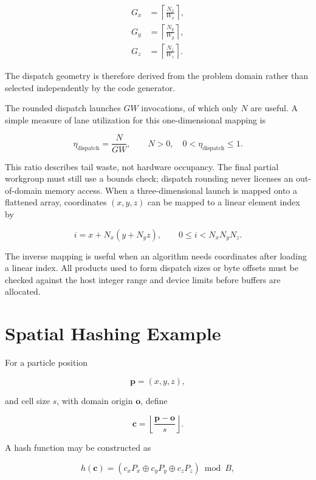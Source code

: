 \documentclass[11pt,a4paper,oneside]{report}
\begin{document}
\begin{align}
G_x &= \left\lceil\frac{N_x}{W_x}\right\rceil,\\
G_y &= \left\lceil\frac{N_y}{W_y}\right\rceil,\\
G_z &= \left\lceil\frac{N_z}{W_z}\right\rceil.
\end{align}

The dispatch geometry is therefore derived from the problem domain rather than selected
independently by the code generator.

The rounded dispatch launches $GW$ invocations, of which only $N$ are useful. A simple measure
of lane utilization for this one-dimensional mapping is

\begin{equation}
\eta_{\mathrm{dispatch}}=\frac{N}{GW},
\qquad N>0,\quad 0<\eta_{\mathrm{dispatch}}\le 1.
\end{equation}

This ratio describes tail waste, not hardware occupancy. The final partial workgroup must still
use a bounds check; dispatch rounding never licenses an out-of-domain memory access. When a
three-dimensional launch is mapped onto a flattened array, coordinates $(x,y,z)$ can be mapped
to a linear element index by

\begin{equation}
i=x+N_x(y+N_yz),
\qquad 0\le i<N_xN_yN_z.
\end{equation}

The inverse mapping is useful when an algorithm needs coordinates after loading a linear index.
All products used to form dispatch sizes or byte offsets must be checked against the host integer
range and device limits before buffers are allocated.

\section{Spatial Hashing Example}

For a particle position

\[
\mathbf{p}=(x,y,z),
\]

and cell size $s$, with domain origin $\mathbf{o}$, define

\begin{equation}
\mathbf{c}=
\left\lfloor
\frac{\mathbf{p}-\mathbf{o}}{s}
\right\rfloor.
\end{equation}

A hash function may be constructed as

\begin{equation}
h(\mathbf{c})
=
\left(
c_xP_x
\oplus
c_yP_y
\oplus
c_zP_z
\right)
\bmod B,
\end{equation}
\end{document}

